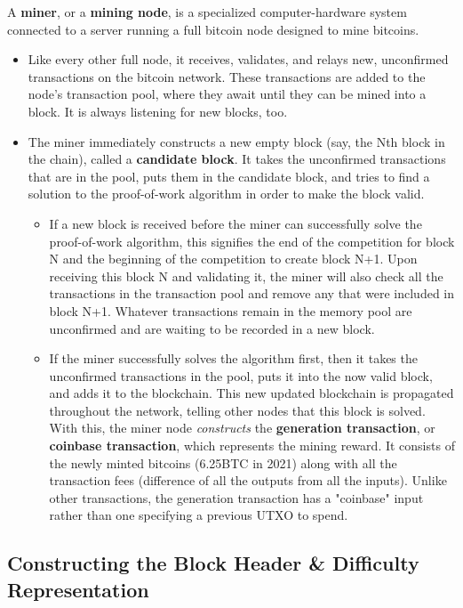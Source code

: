 \documentclass{article}
\newcounter{algo}[section]
\begin{document}
    A \textbf{miner}, or a \textbf{mining node}, is a specialized computer-hardware system connected to a server running a full bitcoin node designed to mine bitcoins.

    \begin{itemize}
      \item Like every other full node, it receives, validates, and relays new, unconfirmed transactions on the bitcoin network. These transactions are added to the node's transaction pool, where they await until they can be mined into a block. It is always listening for new blocks, too.
      \item The miner immediately constructs a new empty block (say, the Nth block in the chain), called a \textbf{candidate block}. It takes the unconfirmed transactions that are in the pool, puts them in the candidate block, and tries to find a solution to the proof-of-work algorithm in order to make the block valid.
      \begin{itemize}
        \item If a new block is received before the miner can successfully solve the proof-of-work algorithm, this signifies the end of the competition for block N and the beginning of the competition to create block N+1. Upon receiving this block N and validating it, the miner will also check all the transactions in the transaction pool and remove any that were included in block N+1. Whatever transactions remain in the memory pool are unconfirmed and are waiting to be recorded in a new block.
        \item If the miner successfully solves the algorithm first, then it takes the unconfirmed transactions in the pool, puts it into the now valid block, and adds it to the blockchain. This new updated blockchain is propagated throughout the network, telling other nodes that this block is solved.
        With this, the miner node \textit{constructs} the \textbf{generation transaction}, or \textbf{coinbase transaction}, which represents the mining reward. It consists of the newly minted bitcoins (6.25BTC in 2021) along with all the transaction fees (difference of all the outputs from all the inputs). Unlike other transactions, the generation transaction has a "coinbase" input rather than one specifying a previous UTXO to spend.
      \end{itemize}
    \end{itemize}

  \subsection{Constructing the Block Header \& Difficulty Representation}
\end{document}
